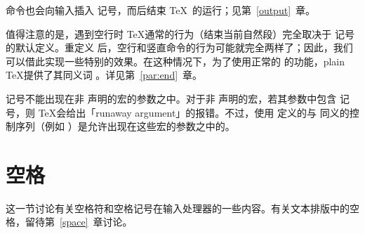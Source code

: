\documentclass{book}
\begin{document}
 命令也会向输入插入  记号，而后结束 \TeX\ 的运行；见第~\ref{output}~章。

值得注意的是，遇到空行时 \TeX 通常的行为（结束当前自然段）完全取决于  记号的默认定义。重定义  后，空行和竖直命令的行为可能就完全两样了；因此，我们可以借此实现一些特别的效果。在这种情况下，为了使用正常的  的功能，plain \TeX 提供了其同义词 。详见第~\ref{par:end}~章。

 记号不能出现在非  声明的宏的参数之中。对于非  声明的宏，若其参数中包含  记号，则 \TeX 会给出「runaway argument」的报错。不过，使用  定义的与  同义的控制序列（例如 ）是允许出现在这些宏的参数之中的。

\section{空格}

这一节讨论有关空格符和空格记号在输入处理器的一些内容。有关文本排版中的空格，留待第~\ref{space}~章讨论。
\end{document}
